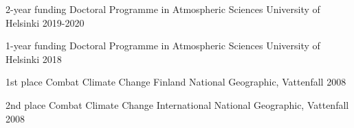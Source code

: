



\begin{cvhonors}
	
  \cvhonor
    {2-year funding} %
    {Doctoral Programme in Atmospheric Sciences} %
    {University of Helsinki} %
    {2019-2020} %
	
  \cvhonor
    {1-year funding} %
    {Doctoral Programme in Atmospheric Sciences} %
    {University of Helsinki} %
    {2018} %

  \cvhonor
    {1st place} %
    {Combat Climate Change Finland} %
    {National Geographic, Vattenfall} %
    {2008} %

  \cvhonor
    {2nd place} %
    {Combat Climate Change International} %
    {National Geographic, Vattenfall} %
    {2008} %


\end{cvhonors}




\begin{cvhonors}




\end{cvhonors}
